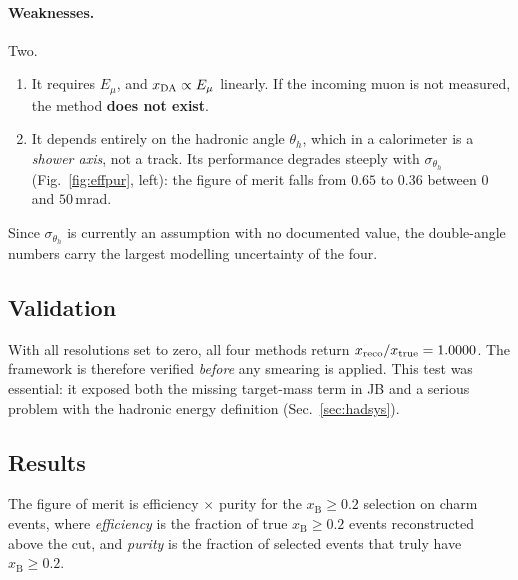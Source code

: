 \documentclass[11pt,a4paper]{article}
\newcommand{\xB}{x_{\mathrm{B}}}
\newcommand{\Ein}{E_{\mu}}
\newcommand{\thh}{\theta_{h}}
\begin{document}
\paragraph{Weaknesses.} Two.
\begin{enumerate}
  \item It requires $\Ein$, and $x_{\rm DA}\propto\Ein$ linearly. If the incoming
        muon is not measured, the method \textbf{does not exist}.
  \item It depends entirely on the hadronic angle $\thh$, which in a calorimeter
        is a \emph{shower axis}, not a track. Its performance degrades steeply
        with $\sigma_{\thh}$ (Fig.~\ref{fig:effpur}, left): the figure of merit
        falls from $0.65$ to $0.36$ between $0$ and $50\,$mrad.
\end{enumerate}
Since $\sigma_{\thh}$ is currently an assumption with no documented value, the
double-angle numbers carry the largest modelling uncertainty of the four.

\subsection{Validation}
With all resolutions set to zero, all four methods return
$x_{\rm reco}/x_{\rm true}=1.0000$. The framework is therefore verified
\emph{before} any smearing is applied. This test was essential: it exposed both
the missing target-mass term in JB and a serious problem with the hadronic
energy definition (Sec.~\ref{sec:hadsys}).

\subsection{Results}
\label{sec:results}

The figure of merit is efficiency $\times$ purity for the $\xB\geq0.2$
selection on charm events, where
\emph{efficiency} is the fraction of true $\xB\geq0.2$ events reconstructed
above the cut, and \emph{purity} is the fraction of selected events that truly
have $\xB\geq0.2$.
\end{document}
